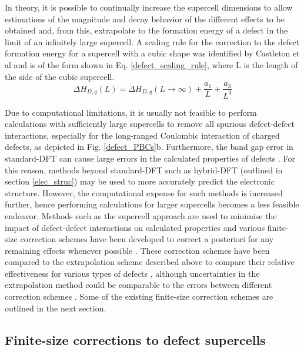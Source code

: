\documentclass[11pt, twoside]{report}
\begin{document}
In theory, it is possible to continually increase the supercell dimensions to allow estimations of the magnitude and decay behavior of the different effects to be obtained and, from this, extrapolate to the formation energy of a defect in the limit of an infinitely large supercell. A scaling rule for the correction to the defect formation energy for a supercell with a cubic shape was identified by Castleton et al \cite{supercell_scaling} and is of the form shown in Eq. \ref{defect_scaling_rule}, where L is the length of the side of the cubic supercell.
\begin{equation}\label{defect_scaling_rule}
\Delta H_{D,q}(L) = \Delta H_{D,q}(L \rightarrow \infty) + \frac{a_1}{L} + \frac{a_3}{L^3}
\end{equation}

Due to computational limitations, it is usually not feasible to perform calculations with sufficiently large supercells to remove all spurious defect-defect interactions, especially for the long-ranged Coulombic interaction of charged defects, as depicted in Fig. \ref{defect_PBCs}b.
Furthermore, the band gap error in standard-DFT can cause large errors in the calculated properties of defects \cite{Lany_defects}. For this reason, methods beyond standard-DFT such as hybrid-DFT (outlined in section \ref{elec_struc}) may be used to more accurately predict the electronic structure. However, the computational expense for such methods is increased further, hence performing calculations for larger supercells becomes a less feasible endeavor.
Methods such as the supercell approach are used to minimise the impact of defect-defect interactions on calculated properties and various finite-size correction schemes have been developed to correct a posteriori for any remaining effects whenever possible \cite{freysoldt_rev}. These correction schemes have been compared to the extrapolation scheme described above to compare their relative effectiveness for various types of defects \cite{komsa}, although uncertainties in the extrapolation method could be comparable to the errors between different correction schemes \cite{Durrant_defects}. Some of the existing finite-size correction schemes are outlined in the next section. 

\subsection{Finite-size corrections to defect supercells}
\end{document}
